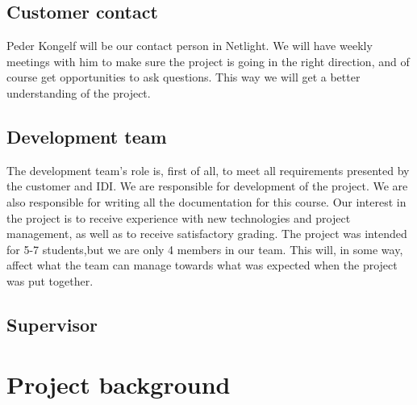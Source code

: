 \subsection{Customer contact}
Peder Kongelf will be our contact person in Netlight. We will have weekly meetings with him to make sure the project is going in the right direction, and of course get opportunities to ask questions. This way we will get a better understanding of the project.

\subsection{Development team}
 The development team's role is, first of all, to meet all requirements presented by the customer and IDI. We are responsible for development of the project. We are also responsible for writing all the documentation for this course.  Our interest in the project is to receive experience with new technologies and project management, as well as to receive satisfactory grading. The project was intended for 5-7 students,but we are only 4 members in our team. This will, in some way, affect what the team can manage towards what was expected when the project was put together.

\subsection{Supervisor}
\section{Project background}

 
